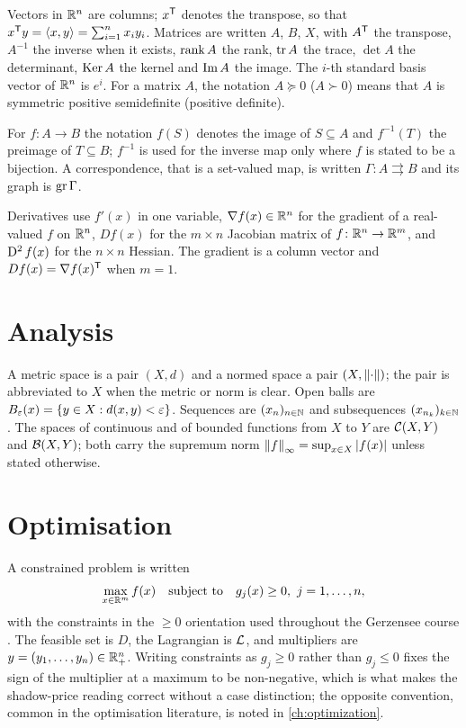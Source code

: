 Vectors in $\mathbb{R}^n$ are columns; $x^{\mathsf{T}}$ denotes the transpose, so that
$x^{\mathsf{T}}y=\left\langle x,y\right\rangle=\sum_{i=1}^n x_iy_i$. Matrices are written $A$, $B$,
$X$, with $A^{\mathsf{T}}$ the transpose, $A^{-1}$ the inverse when it exists,
$\operatorname{rank} A$ the rank, $\operatorname{tr} A$ the trace, $\det A$ the determinant, $\operatorname{Ker} A$ the
kernel and $\operatorname{Im} A$ the image. The $i$-th standard basis vector of $\mathbb{R}^n$ is
$e^i$. For a matrix $A$, the notation $A\succeq 0$ ($A\succ 0$) means that $A$
is symmetric positive semidefinite (positive definite).

For $f\colon A\to B$ the notation $f(S)$ denotes the image of $S\subseteq A$ and
$f^{-1}(T)$ the preimage of $T\subseteq B$; $f^{-1}$ is used for the inverse map
only where $f$ is stated to be a bijection. A correspondence, that is a
set-valued map, is written $\Gamma\colon A\rightrightarrows B$ and its graph is
$\operatorname{gr}\Gamma$.

Derivatives use $f'(x)$ in one variable, $\nabla f(x)\in\mathbb{R}^n$ for the gradient of
a real-valued $f$ on $\mathbb{R}^n$, $Df(x)$ for the $m\times n$ Jacobian matrix of
$f\colon\mathbb{R}^n\to\mathbb{R}^m$, and $\operatorname{D^2} f(x)$ for the $n\times n$ Hessian. The gradient
is a column vector and $Df(x)=\nabla f(x)^{\mathsf{T}}$ when $m=1$.

\section*{Analysis}

A metric space is a pair $(X,d)$ and a normed space a pair $(X,\left\lVert\cdot\right\rVert)$;
the pair is abbreviated to $X$ when the metric or norm is clear. Open balls are
$B_{\varepsilon}(x)=\{y\in X: d(x,y)<\varepsilon\}$. Sequences are
$(x_n)_{n\in\mathbb{N}}$ and subsequences $(x_{n_k})_{k\in\mathbb{N}}$. The spaces of continuous
and of bounded functions from $X$ to $Y$ are $\mathcal{C}(X,Y)$ and
$\mathcal{B}(X,Y)$; both carry the supremum norm
$\left\lVert f\right\rVert_\infty=\sup_{x\in X}\left\lvert f(x)\right\rvert$ unless stated otherwise.

\section*{Optimisation}

A constrained problem is written
\[
	\max_{x\in\R^m} f(x)\quad \st\quad g_j(x)\geq 0,\ j=1,\dots,n,
\]
with the constraints in the $\geq 0$ orientation used throughout the Gerzensee
course \autocite[slide 3]{fukuda2026optimization}. The feasible set is $D$, the
Lagrangian is $\mathcal{L}$, and multipliers are $y=(y_1,\dots,y_n)\in\mathbb{R}^n_+$. Writing
constraints as $g_j\geq0$ rather than $g_j\leq0$ fixes the sign of the multiplier
at a maximum to be non-negative, which is what makes the shadow-price reading
correct without a case distinction; the opposite convention, common in the
optimisation literature, is noted in \autoref{ch:optimization}.

